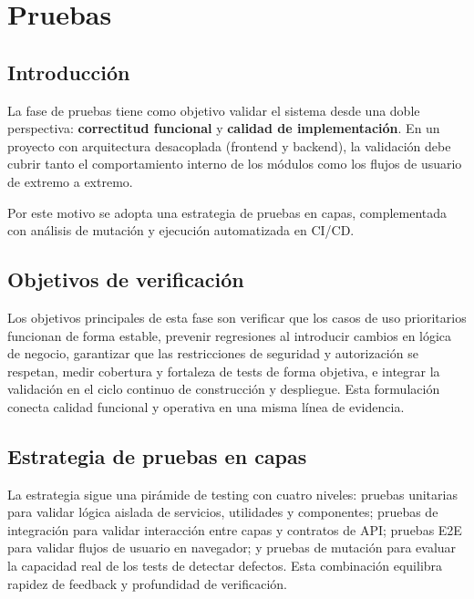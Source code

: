 \chapter{Pruebas}\label{pruebas}
\makeatletter
{}
\makeatother

\FloatBarrier
\section{Introducci\'on}

La fase de pruebas tiene como objetivo validar el sistema desde una doble perspectiva:
\textbf{correctitud funcional} y \textbf{calidad de implementaci\'on}.
En un proyecto con arquitectura desacoplada (frontend y backend),
la validaci\'on debe cubrir tanto el comportamiento interno de los m\'odulos
como los flujos de usuario de extremo a extremo.

Por este motivo se adopta una estrategia de pruebas en capas,
complementada con an\'alisis de mutaci\'on y ejecuci\'on automatizada en CI/CD.

\FloatBarrier
\section{Objetivos de verificaci\'on}

Los objetivos principales de esta fase son verificar que los casos de uso prioritarios funcionan de forma estable, prevenir regresiones al introducir cambios en l\'ogica de negocio, garantizar que las restricciones de seguridad y autorizaci\'on se respetan, medir cobertura y fortaleza de tests de forma objetiva, e integrar la validaci\'on en el ciclo continuo de construcci\'on y despliegue. Esta formulaci\'on conecta calidad funcional y operativa en una misma l\'inea de evidencia.

\FloatBarrier
\section{Estrategia de pruebas en capas}

La estrategia sigue una pir\'amide de testing con cuatro niveles: pruebas unitarias para validar l\'ogica aislada de servicios, utilidades y componentes; pruebas de integraci\'on para validar interacci\'on entre capas y contratos de API; pruebas E2E para validar flujos de usuario en navegador; y pruebas de mutaci\'on para evaluar la capacidad real de los tests de detectar defectos. Esta combinaci\'on equilibra rapidez de feedback y profundidad de verificaci\'on.

